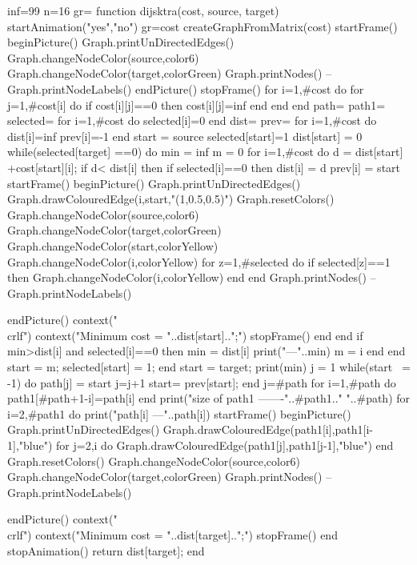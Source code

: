 

\startluacode
inf=99
n=16
gr={{}}
function dijsktra(cost, source, target)
	startAnimation("yes","no")
	gr=cost
	createGraphFromMatrix(cost)
	startFrame()
	beginPicture()
	Graph.printUnDirectedEdges()
	Graph.changeNodeColor(source,color6)
	Graph.changeNodeColor(target,colorGreen)
	Graph.printNodes()	
	--Graph.printNodeLabels()
	endPicture()
	stopFrame()
	for i=1,#cost do
		for j=1,#cost[i] do
			if cost[i][j]==0 then
				cost[i][j]=inf
			end
		end
	end
	path={}
	path1={}
	selected={}
	for i=1,#cost do
		selected[i]=0
	end
	dist={}
	prev={}
	for i=1,#cost do
		dist[i]=inf
		prev[i]=-1
	end
	start = source
        selected[start]=1
	dist[start] = 0
	while(selected[target] ==0) do
		min = inf
		m = 0
		for i=1,#cost do
		    d = dist[start] +cost[start][i];
		    if d< dist[i] then
			if selected[i]==0 then
				dist[i] = d
				prev[i] = start
				startFrame()
				beginPicture()
				Graph.printUnDirectedEdges()
				Graph.drawColouredEdge(i,start,"(1,0.5,0.5)")
				Graph.resetColors()
				Graph.changeNodeColor(source,color6)
				Graph.changeNodeColor(target,colorGreen)
				Graph.changeNodeColor(start,colorYellow)
				Graph.changeNodeColor(i,colorYellow)
				for z=1,#selected do
					if selected[z]==1 then
						Graph.changeNodeColor(i,colorYellow)
					end
				end
				Graph.printNodes()
				--Graph.printNodeLabels()
			
				endPicture()
				context("\\crlf")
				context("Minimum cost = "..dist[start]..";")
				stopFrame()
			end
		    end
		    if min>dist[i] and selected[i]==0 then
			min = dist[i]
			print("---"..min)
			m = i
		    end
		end
		start = m;
		selected[start] = 1;
	end
	start = target;
	print(min)
	j = 1
	while(start ~= -1) do
		path[j] = start
		j=j+1
		start= prev[start];
	end
	j=#path
	for i=1,#path do
		path1[#path+1-i]=path[i]
	end
	print("size of path1 -------"..#path1.."  "..#path)
	for i=2,#path1 do
			print("path[i] ---"..path[i])
			startFrame()
			beginPicture()
			Graph.printUnDirectedEdges()
			Graph.drawColouredEdge(path1[i],path1[i-1],"blue")
			for j=2,i do
				Graph.drawColouredEdge(path1[j],path1[j-1],"blue")
			end
			Graph.resetColors()
			Graph.changeNodeColor(source,color6)
			Graph.changeNodeColor(target,colorGreen)
			Graph.printNodes()
			--Graph.printNodeLabels()
			
			endPicture()
			context("\\crlf")
			context("Minimum cost = "..dist[target]..";")
			stopFrame()
	end
	stopAnimation()
	return dist[target];
end

\stopluacode

